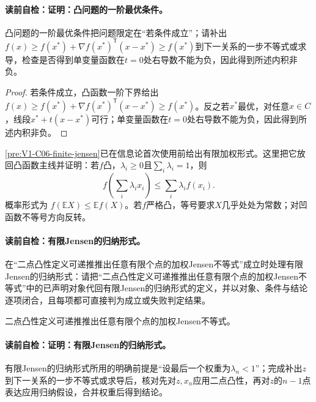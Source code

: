 \paragraph{读前自检：证明：凸问题的一阶最优条件。}凸问题的一阶最优条件把问题限定在“若条件成立”；请补出$f(x)\ge f(x^*)+\nabla f(x^*)^{\mathsf T}(x-x^*)\ge f(x^*)$到下一关系的一步不等式或求导，检查是否得到单变量函数在$t=0$处右导数不能为负，因此得到所述内积非负。\par

\begin{proof}
若条件成立，凸函数一阶下界给出 $f(x)\ge f(x^*)+\nabla f(x^*)^{\mathsf T}(x-x^*)\ge f(x^*)$。反之若$x^*$最优，对任意$x\in C$，线段$x^*+t(x-x^*)$可行；单变量函数在$t=0$处右导数不能为负，因此得到所述内积非负。
\end{proof}


\cref{pre:V1-C06-finite-jensen}已在信息论首次使用前给出有限加权形式。这里把它放回凸函数主线并证明：若$f$凸，$\lambda_i\ge0$且$\sum_i\lambda_i=1$，则
\[
f\!\left(\sum_i\lambda_ix_i\right)\le\sum_i\lambda_if(x_i).
\]
概率形式为 $f(\mathbb EX)\le\mathbb E f(X)$。若$f$严格凸，等号要求$X$几乎处处为常数；对凹函数不等号方向反转。

\label{struct:V1-C07-CH13}
\paragraph{读前自检：有限Jensen的归纳形式。}在“二点凸性定义可递推推出任意有限个点的加权Jensen不等式”成立时处理有限Jensen的归纳形式：请把“二点凸性定义可递推推出任意有限个点的加权Jensen不等式”中的已声明对象代回有限Jensen的归纳形式的定义，并以对象、条件与结论逐项闭合，且每项都可直接判为成立或失败判定结果。\par

\begin{lemma}[有限Jensen的归纳形式]
二点凸性定义可递推推出任意有限个点的加权Jensen不等式。
\end{lemma}
\paragraph{读前自检：证明：有限Jensen的归纳形式。}有限Jensen的归纳形式所用的明确前提是“设最后一个权重为$\lambda_n<1$”；完成补出$z$到下一关系的一步不等式或求导后，核对先对$z,x_n$应用二点凸性，再对$z$的$n-1$点表达应用归纳假设，合并权重后得到结论。\par

